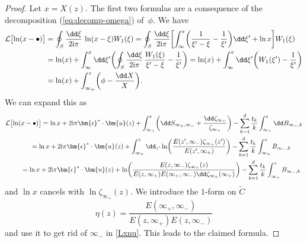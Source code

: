 \documentclass[pdftex]{sigma}
\numberwithin{equation}{section}
\begin{document}
\begin{proof}
 Let $x = X(z)$. The first two formulas are a consequence of the decomposition (\ref{eq:decomp-omega})
 of~$\phi$. We have
 \begin{align*}
 \mathcal{L}\bigl[\ln(x - \bullet)\bigr]
 &= \oint_{S} \frac{\dd\xi}{2{\rm i}\pi}\,\ln(x - \xi)W_{1}(\xi)
  = \oint_{S} \frac{\dd \xi}{2{\rm i}\pi} \biggl[\int_{\infty}^{x}\biggl(\frac{1}{\xi' - \xi} - \frac{1}{\xi'}\biggr) \dd \xi' + \ln x \biggr]W_{1}(\xi)\\
 &= \ln(x) + \int_{\infty}^{x} \dd \xi' \biggl(\oint_{S} \frac{\dd \xi}{2{\rm i}\pi}\,\frac{W_1(\xi)}{\xi' - \xi} - \frac{1}{\xi'}\biggr)
  = \ln(x) + \int_{\infty}^{x} \dd \xi'\biggl(W_{1}(\xi') - \frac{1}{\xi'}\biggr)\\
 &= \ln(x) + \int_{\infty_{+}}^{z}\biggl(\phi - \frac{\dd X}{X}\biggr).
 \end{align*}
 We can expand this as
 \begin{gather}
 \mathcal{L}\bigl[\ln(x - \bullet)\bigr]
  = \ln x + 2{\rm i}\pi \bm{\epsilon}^* \cdot \bm{u}(z) + \int_{\infty_+}^{z} \biggl(\dd S_{\infty_+,\infty_-} + \frac{\dd \zeta_{\infty_+}}{\zeta_{\infty_+}}\biggr) - \sum_{k = 1}^{d} \frac{t_k}{k} \int_{\infty_+}^{z} \dd B_{\infty_-,k} \nonumber\\
 \qquad{} = \ln x + 2{\rm i}\pi \bm{\epsilon}^* \cdot \bm{u}(z) + \int_{\infty_+}^z \dd_{z'} \ln\biggl(\frac{E(z',\infty_-)\zeta_{\infty_+}(z')}{E(z',\infty_+)}\biggr) - \sum_{k = 1}^{d} \frac{t_k}{k} \int_{\infty_+}^{z} B_{\infty_-,k}\label{Lxnu}\\
 \qquad{} = \ln x + 2{\rm i}\pi \bm{\epsilon}^* \cdot \bm{u}(z) + \ln\biggl(\frac{E(z,\infty_-)\zeta_{\infty_+}(z)}{E(z,\infty_+)E(\infty_+,\infty_-)\dd \zeta_{\infty_+}(\infty_+)}\biggr) - \sum_{k = 1}^{d} \frac{t_k}{k} \int_{\infty_+}^{z} B_{\infty_-,k}\nonumber
 \end{gather}
and $\ln x$ cancels with $\ln \zeta_{\infty_+}(z)$. We introduce the $1$-form on $\widetilde{C}$
\begin{equation}
\label{etadef}\eta(z) = \frac{E(\infty_+,\infty_-)}{E(z,\infty_+)E(z,\infty_-)}
\end{equation}
and use it to get rid of $\infty_-$ in \eqref{Lxnu}. This leads to the claimed formula.


\end{proof}
\end{document}
